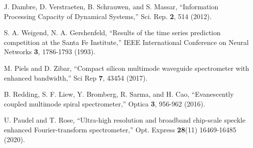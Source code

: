 \documentclass{article}
\begin{document}
\begin{thebibliography}{9}
J. Dambre, D. Verstraeten, B. Schrauwen, and S. Massar,
``Information Processing Capacity of Dynamical Systems,''
Sci. Rep. {\bf 2}, 514 (2012). 

S. A. Weigend, N. A. Gershenfeld,
``Results of the time series prediction competition at the
Santa Fe Institute,''
IEEE International Conference on Neural Networks {\bf 3}, 
1786-1793 (1993).

M. Piels and D. Zibar, 
``Compact silicon multimode waveguide spectrometer with enhanced bandwidth,''
Sci Rep {\bf 7}, 43454 (2017).

B. Redding, S. F. Liew, Y. Bromberg, R. Sarma, and H. Cao, 
``Evanescently coupled multimode spiral spectrometer,'' 
Optica {\bf 3}, 956-962 (2016).

U. Paudel and T. Rose,
``Ultra-high resolution and broadband chip-scale speckle enhanced Fourier-transform
spectrometer,'' Opt. Express {\bf 28}(11) 16469-16485 (2020). 

\end{thebibliography}
\end{document}
